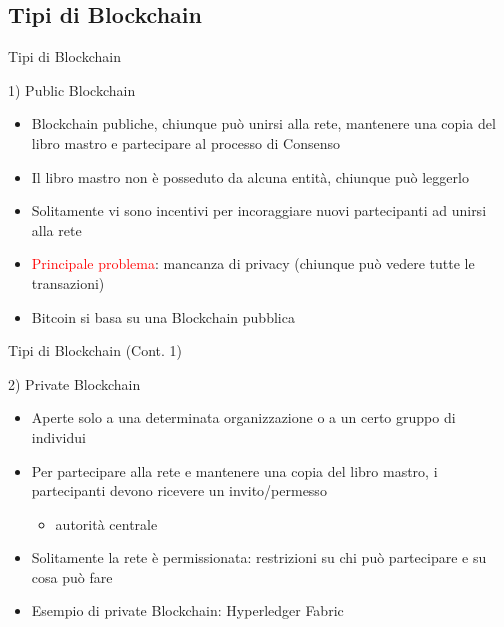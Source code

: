 \documentclass{beamer}
\newcommand\red[1]{\textcolor{red}{#1}}
\begin{document}
  \subsection{Tipi di Blockchain}
  \begin{frame}{Tipi di Blockchain}
    \begin{block}{1) Public Blockchain}
      \begin{itemize}
        \item Blockchain publiche, chiunque può unirsi alla rete, mantenere una copia del libro mastro e partecipare al processo di Consenso 
        \item Il libro mastro non è posseduto da alcuna entità, chiunque può leggerlo
        \item Solitamente vi sono incentivi per incoraggiare nuovi partecipanti ad unirsi alla rete \pause
        \item \red{Principale problema}: mancanza di privacy (chiunque può vedere tutte le transazioni) \pause
        \item Bitcoin si basa su una Blockchain pubblica
      \end{itemize}
    \end{block}
  \end{frame}




  \begin{frame}{Tipi di Blockchain (Cont. 1)}
    \begin{block}{2) Private Blockchain}
      \begin{itemize}
        \item Aperte solo a una determinata organizzazione o a un certo gruppo di individui
        \item Per partecipare alla rete e mantenere una copia del libro mastro, i partecipanti devono ricevere un invito/permesso
        \begin{itemize}
            \item[\MVRightarrow] autorità centrale
        \end{itemize}
        \item Solitamente la rete è permissionata: restrizioni su chi può partecipare e su cosa può fare
        \item Esempio di private Blockchain: Hyperledger Fabric \cite{hyperledger-fabric}
      \end{itemize}
    \end{block}
  \end{frame}
\end{document}
